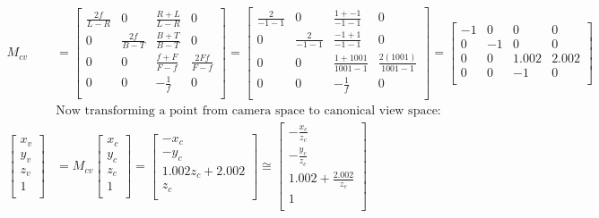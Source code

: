 \documentclass{article} %
\begin{document}
\begin{align*}
M_{cv} &= 
\left[
\begin{matrix}
\frac{2f}{L-R} & 0 & \frac{R + L}{L - R} & 0\\
0 & \frac{2f}{B-T} & \frac{B + T}{B - T} & 0\\
0 & 0 & \frac{f + F}{F - f} & \frac{2Ff}{F - f}\\
0 & 0 & -\frac{1}{f} & 0\\
\end{matrix}
\right]
= \left[
\begin{matrix}
\frac{2}{-1-1} & 0 & \frac{1 + -1}{-1 - 1} & 0\\
0 & \frac{2}{-1-1} & \frac{-1 + 1}{-1 - 1} & 0\\
0 & 0 & \frac{1 + 1001}{1001 - 1} & \frac{2(1001)}{1001 - 1}\\
0 & 0 & -\frac{1}{f} & 0\\
\end{matrix}
\right]
=
\left[
\begin{matrix}
-1 & 0 & 0 & 0\\
0 & -1 & 0 & 0\\
0 & 0 & 1.002 & 2.002\\
0 & 0 & -1 & 0\\
\end{matrix}
\right]\\
&\text{Now transforming a point from camera space to canonical view space:}\\
\left[
\begin{matrix}
x_v\\
y_v\\
z_v\\
1\\
\end{matrix}
\right]
&= M_{cv} \left[
\begin{matrix}
x_c\\
y_c\\
z_c\\
1\\
\end{matrix}
\right]
= \left[
\begin{matrix}
-x_c\\
-y_c\\
1.002 z_c + 2.002\\
z_c\\
\end{matrix}
\right]
\cong
\left[
\begin{matrix}
-\frac{x_c}{z_c}\\
-\frac{y_c}{z_c}\\
1.002 + \frac{2.002}{z_c}\\
1\\
\end{matrix}
\right]
\end{align*}
\end{document}
